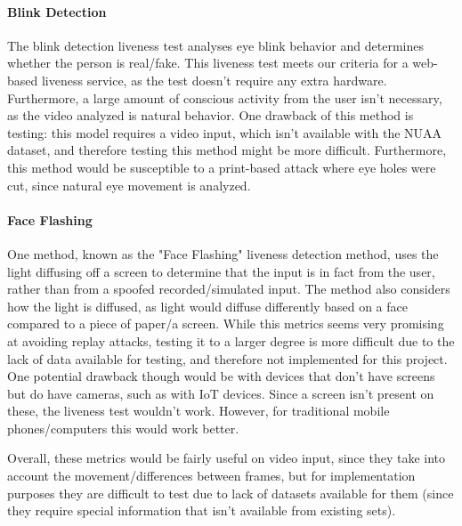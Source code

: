 \documentclass[10pt,a4paper]{article}
\begin{document}
            \paragraph{Blink Detection}
            The blink detection liveness test analyses eye blink behavior and determines whether the person is real/fake. This liveness test meets our criteria for a web-based liveness service,
            as the test doesn't require any extra hardware. Furthermore, a large amount of conscious activity from the user isn't necessary, as the video analyzed is natural behavior.
            One drawback of this method is testing: this model requires a video input, which isn't available with the NUAA dataset, and therefore testing this method might be more difficult.
            \cite{BlinkDetectionLivenessTest} Furthermore, this method would be susceptible to a print-based attack where eye holes were cut, since natural eye movement is analyzed.
            
            \paragraph{Face Flashing}
            One method, known as the "Face Flashing" liveness detection method, uses the light diffusing off a screen to determine that the input is in fact from the user, rather than from a spoofed recorded/simulated input.
            The method also considers how the light is diffused, as light would diffuse differently based on a face compared to a piece of paper/a screen. \cite{LivenessTestFaceFlashing}
            While this metrics seems very promising at avoiding replay attacks, testing it to a larger degree is more difficult due to the lack of data available for testing, and therefore not implemented for this project.
            One potential drawback though would be with devices that don't have screens but do have cameras, such as with IoT devices. Since a screen isn't present on these, the liveness test wouldn't work. However, for traditional mobile phones/computers
            this would work better.

            Overall, these metrics would be fairly useful on video input, since they take into account the movement/differences between frames, but for implementation purposes they are difficult to test due to lack of datasets available for them
            (since they require special information that isn't available from existing sets). 
\end{document}
